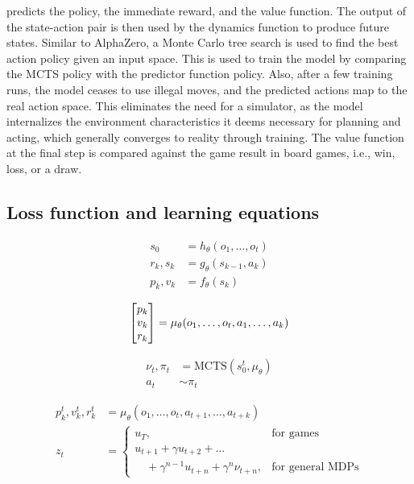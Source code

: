 predicts the policy, the immediate reward, and the value function. The output of the state-action pair is
then used by the dynamics function to produce future states. Similar to AlphaZero, a Monte Carlo tree
search is used to find the best action policy given an input space. This is used to train the model by
comparing the MCTS policy with the predictor function policy. Also, after a few training runs, the model
ceases to use illegal moves, and the predicted actions map to the real action space. This eliminates the
need for a simulator, as the model internalizes the environment characteristics it deems necessary for
planning and acting, which generally converges to reality through training. The value function at
the final step is compared against the game result in board games, i.e., win, loss, or a draw.

\subsection{Loss function and learning equations}

\begin{align}
    s_0      & = h_\theta(o_1, \ldots, o_t) \\
    r_k, s_k & = g_\theta(s_{k-1}, a_k)     \\
    p_k, v_k & = f_\theta(s_k)
\end{align}

\begin{equation}
    \setlength{\arraycolsep}{1.5pt} %
    \begin{bmatrix}
        p_k \\ v_k \\ r_k
    \end{bmatrix}
    =
    \mu_\theta(o_1, \ldots, o_t, a_1, \ldots, a_k)
    \label{eq:matrix}
\end{equation}

\begin{align}
    \nu_t, \pi_t & = \text{MCTS}(s_0^t, \mu_\theta) \\
    a_t          & \sim \pi_t
\end{align}

\begin{align}
    p_k^t, v_k^t, r_k^t & = \mu_\theta(o_1, \ldots, o_t, a_{t+1}, \ldots, a_{t+k}) \\
    z_t                 & =
    \begin{cases}
        u_T,                                               & \text{for games}        \\
        u_{t+1} + \gamma u_{t+2} + \ldots \nonumber                                  \\
        \quad + \gamma^{n-1} u_{t+n} + \gamma^n \nu_{t+n}, & \text{for general MDPs}
    \end{cases}
\end{align}

